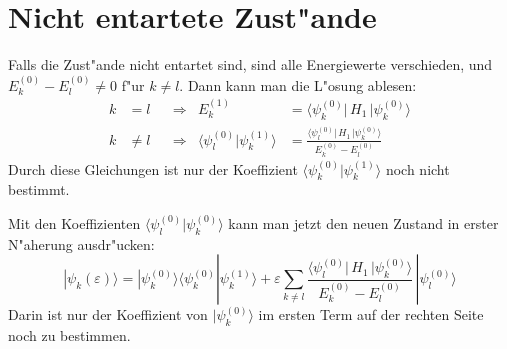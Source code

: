 \section{Nicht entartete Zust"ande\label{section:nichtentartetezustaende}}
Falls die Zust"ande nicht entartet sind, sind alle Energiewerte
verschieden, und $E_k^{(0)}-E_l^{(0)}\ne 0$ f"ur $k\ne l$. 
Dann kann man die L"osung ablesen:
\begin{equation}
\begin{aligned}
k&=l
&&\Rightarrow&
E_k^{(1)}
&=
\langle \psi_k^{(0)}|\, H_1 \,|\psi_k^{(0)}\rangle
\\
k&\ne l
&&\Rightarrow&
\langle\psi_l^{(0)}|\psi_k^{(1)}\rangle
&=
\frac{\langle \psi_l^{(0)}|\, H_1 \,|\psi_k^{(0)}\rangle}{E_k^{(0)}-E_l^{(0)}}
\end{aligned}
\label{skript:stoerungsloesung1ordnung}
\end{equation}
Durch diese Gleichungen ist nur der Koeffizient
$\langle\psi_k^{(0)}|\psi_k^{(1)}\rangle$
noch nicht bestimmt.

Mit den Koeffizienten $\langle\psi_l^{(0)}|\psi_k^{(0)}\rangle$ kann
man jetzt den neuen Zustand in erster N"aherung ausdr"ucken:
\begin{equation}
|\psi_k(\varepsilon)\rangle
=
|\psi_k^{(0)}\rangle
\langle\psi_k^{(0)}|\psi_k^{(1)}\rangle
+\varepsilon
\sum_{k\ne l}
\frac{\langle \psi_l^{(0)}|\, H_1 \,|\psi_k^{(0)}\rangle}{E_k^{(0)}-E_l^{(0)}}
\,
|\psi_l^{(0)}\rangle
\end{equation}
Darin ist nur der Koeffizient von $|\psi_k^{(0)}\rangle$ im ersten
Term auf der rechten Seite noch zu bestimmen.

